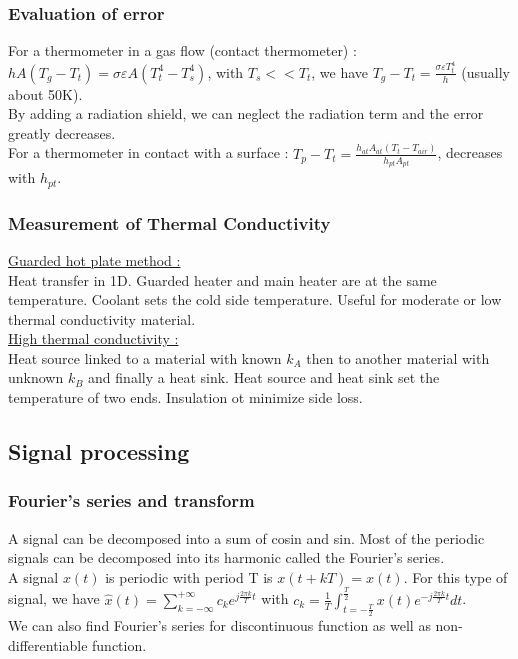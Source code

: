 \documentclass[../main.tex]{subfiles}
\begin{document}
\subsubsection{Evaluation of error}
For a thermometer in a gas flow (contact thermometer) : $hA (T_g-T_t) = \sigma \varepsilon A (T_t^4 - T_s^4)$, with $T_s<<T_t$, we have $T_g - T_t = \frac{\sigma \varepsilon T_t^4}{h}$ (usually about 50K).\\

By adding a radiation shield, we can neglect the radiation term and the error greatly decreases.\\

For a thermometer in contact with a surface : $T_p - T_t = \frac{h_{at} A_{at} (T_t-T_{air})}{h_{pt} A_{pt}}$, decreases with $h_{pt}$.\\

\subsubsection{Measurement of Thermal Conductivity}
\quad \underline{Guarded hot plate method :}\\
Heat transfer in 1D. Guarded heater and main heater are at the same temperature. Coolant sets the cold side temperature. Useful for moderate or low thermal conductivity material.\\

\quad \underline{High thermal conductivity :}\\
Heat source linked to a material with known $k_A$ then to another material with unknown $k_B$ and finally a heat sink. Heat source and heat sink set the temperature of two ends. Insulation ot minimize side loss. \\

\subsection{Signal processing}

\subsubsection{Fourier's series and transform}
A signal can be decomposed into a sum of cosin and sin. Most of the periodic signals can be decomposed into its harmonic called the Fourier's series.\\
A signal $x(t)$ is periodic with period T is $x(t+kT) = x(t)$. For this type of signal, we have $\hat{x}(t) = \sum_{k=-\infty}^{+\infty} c_k e^{j \frac{2\pi k}{T}t}$ with $c_k = \frac{1}{T} \int_{t=-\frac{T}{2}}^{\frac{T}{2}} x(t) e^{-j \frac{2\pi k}{T}t}dt$.\\
We can also find Fourier's series for discontinuous function as well as non-differentiable function.\\
\end{document}
